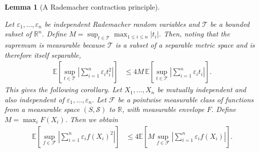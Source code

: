 \documentclass[11pt,lof]{puthesis}
\newcommand{\R}{\ensuremath{\mathbb{R}}}
\newcommand{\E}{\ensuremath{\mathbb{E}}}
\newcommand{\cF}{\ensuremath{\mathcal{F}}}
\newcommand{\cS}{\ensuremath{\mathcal{S}}}
\newcommand{\cT}{\ensuremath{\mathcal{T}}}
\theoremstyle{break}
\newtheorem{lemma}{Lemma}[section]
\theoremstyle{proof}
\begin{document}
\begin{lemma}[A Rademacher contraction principle]
  \label{lem:kernel_app_contraction}

  Let $\varepsilon_1, \ldots, \varepsilon_n$
  be independent Rademacher random variables
  and $\cT$ be a bounded subset of $\R^n$.
  Define $M = \sup_{t \in \cT} \max_{1 \leq i \leq n} |t_i|$.
  Then, noting that the supremum is measurable
  because $\cT$ is a subset of a separable metric space
  and is therefore itself separable,
  \begin{align*}
    \E
    \left[
      \sup_{t \in \cT}
      \left|
      \sum_{i=1}^n
      \varepsilon_i
      t_i^2
      \right|
    \right]
    &\leq
    4M \,
    \E
    \left[
      \sup_{t \in \cT}
      \left|
      \sum_{i=1}^n
      \varepsilon_i
      t_i
      \right|
    \right].
  \end{align*}
  This gives the following corollary.
  Let $X_1, \ldots, X_n$ be mutually independent
  and also independent of $\varepsilon_1, \ldots, \varepsilon_n$.
  Let $\cF$ be a pointwise measurable class of functions
  from a measurable space $(S, \cS)$ to $\R$,
  with measurable envelope $F$.
  Define $M = \max_i F(X_i)$.
  Then we obtain
  \begin{align*}
    \E
    \left[
      \sup_{f \in \cF}
      \left|
      \sum_{i=1}^n
      \varepsilon_i
      f(X_i)^2
      \right|
    \right]
    &\leq
    4
    \E
    \left[
      M
      \sup_{f \in \cF}
      \left|
      \sum_{i=1}^n
      \varepsilon_i
      f(X_i)
      \right|
    \right].
  \end{align*}

\end{lemma}
\end{document}
